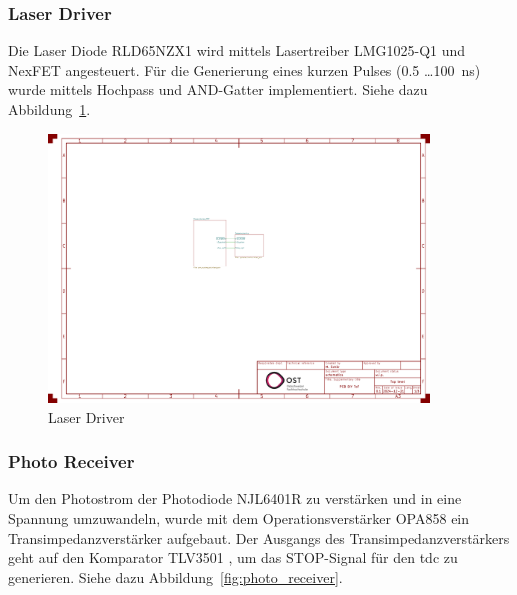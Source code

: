 \documentclass[11pt,a4paper,hidelinks]{article}
\begin{document}
\subsubsection{Laser Driver}

Die Laser Diode RLD65NZX1 \cite{rohm2019rld65nzx1_datasheet} wird mittels Lasertreiber LMG1025-Q1
\cite{ti2024lmg1025q1_datasheet} und NexFET \cite{ti2016csd17578q3a_datasheet} angesteuert. Für die Generierung eines
kurzen Pulses (0.5 \dots 100~ns) wurde mittels Hochpass und AND-Gatter \cite{diodes202074lvc1g08q_datasheet}
implementiert. Siehe dazu Abbildung~\ref{fig:laser_driver}.

\begin{figure}[H]
    \centering
    \includegraphics[page=3, trim=100 520 550 60, clip, width=0.9\textwidth]{attachments/schematic.pdf}
    \caption{Laser Driver}\label{fig:laser_driver}
\end{figure}

\subsubsection{Photo Receiver}\label{sec:schematic_photo_receiver}

Um den Photostrom der Photodiode NJL6401R \cite{jrc2014njl6401r3_datasheet} zu verstärken und in eine Spannung
umzuwandeln, wurde mit dem Operationsverstärker OPA858 \cite{ti2018opa858_datasheet} ein Transimpedanzverstärker
aufgebaut. Der Ausgangs des Transimpedanzverstärkers geht auf den Komparator TLV3501 \cite{ti2016tlv3501_datasheet},
um das STOP-Signal für den \acrshort{tdc} zu generieren. Siehe dazu Abbildung~\ref{fig:photo_receiver}.
\end{document}
